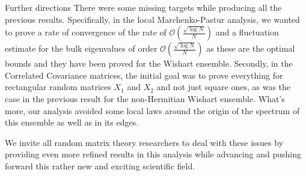 \documentclass[11pt, a4paper, oneside]{book}
\numberwithin{equation}{chapter}
\begin{document}
\begin{section}{Further directions}
%
There were some missing targets while producing all the previous results. Specifically, in the local Marchenko-Pastur analysis, we wanted to prove a rate of convergence of the rate of $\mathcal{O}\left (\frac{\sqrt{\log N}}{N} \right )$ and a fluctuation estimate for the bulk eigenvalues of order $\mathcal{O}\left (\frac{\sqrt{\log N}}{N} \right )$ as these are the optimal bounds and they have been proved for the Wishart ensemble. Secondly, in the Correlated Covariance matrices, the initial goal was to prove everything for rectangular random matrices $X_1$ and $X_2$ and not just square ones, as was the case in the previous result for the non-Hermitian Wishart ensemble. What's more, our analysis avoided some local laws around the origin of the spectrum of this ensemble as well as in its edges.

We invite all random matrix theory researchers to deal with these issues by providing even more refined results in this analysis while advancing and pushing forward this rather new and exciting scientific field.
%
\end{section}

\end{document}

